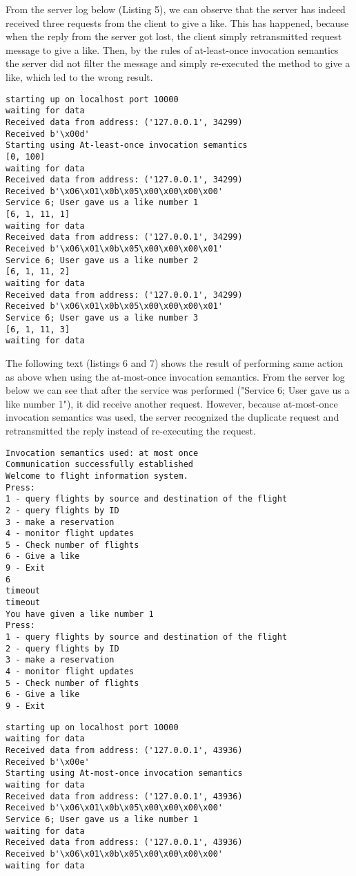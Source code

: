 \documentclass[12pt,a4paper]{article}
\begin{document}
From the server log below (Listing 5), we can observe that the server has indeed received three requests from the client to give a like. This has happened, because when the reply from the server got lost, the client simply retransmitted request message to give a like. Then, by the rules of at-least-once invocation semantics the server did not filter the message and simply re-executed the method to give a like, which led to the wrong result.
\begin{lstlisting}[caption={Server console output},xleftmargin=.03\textwidth]
starting up on localhost port 10000
waiting for data
Received data from address: ('127.0.0.1', 34299)
Received b'\x00d'
Starting using At-least-once invocation semantics
[0, 100]
waiting for data
Received data from address: ('127.0.0.1', 34299)
Received b'\x06\x01\x0b\x05\x00\x00\x00\x00'
Service 6; User gave us a like number 1
[6, 1, 11, 1]
waiting for data
Received data from address: ('127.0.0.1', 34299)
Received b'\x06\x01\x0b\x05\x00\x00\x00\x01'
Service 6; User gave us a like number 2
[6, 1, 11, 2]
waiting for data
Received data from address: ('127.0.0.1', 34299)
Received b'\x06\x01\x0b\x05\x00\x00\x00\x01'
Service 6; User gave us a like number 3
[6, 1, 11, 3]
waiting for data
\end{lstlisting}
\medskip

The following text (listings 6 and 7) shows the result of performing same action as above when using the at-most-once invocation semantics. From the server log below we can see that after the service was performed ("Service 6; User gave us a like number 1"), it did receive another request. However, because at-most-once invocation semantics was used, the server recognized the duplicate request and retransmitted the reply instead of re-executing the request.
\begin{lstlisting}[caption={Client console output},xleftmargin=.03\textwidth]
Invocation semantics used: at most once
Communication successfully established
Welcome to flight information system.
Press:
1 - query flights by source and destination of the flight
2 - query flights by ID
3 - make a reservation
4 - monitor flight updates
5 - Check number of flights
6 - Give a like
9 - Exit
6
timeout
timeout
You have given a like number 1
Press:
1 - query flights by source and destination of the flight
2 - query flights by ID
3 - make a reservation
4 - monitor flight updates
5 - Check number of flights
6 - Give a like
9 - Exit
\end{lstlisting}
\medskip
\pagebreak
\begin{lstlisting}[caption={Server console output},xleftmargin=.03\textwidth]
starting up on localhost port 10000
waiting for data
Received data from address: ('127.0.0.1', 43936)
Received b'\x00e'
Starting using At-most-once invocation semantics
waiting for data
Received data from address: ('127.0.0.1', 43936)
Received b'\x06\x01\x0b\x05\x00\x00\x00\x00'
Service 6; User gave us a like number 1
waiting for data
Received data from address: ('127.0.0.1', 43936)
Received b'\x06\x01\x0b\x05\x00\x00\x00\x00'
waiting for data
\end{lstlisting}
\medskip
\end{document}
